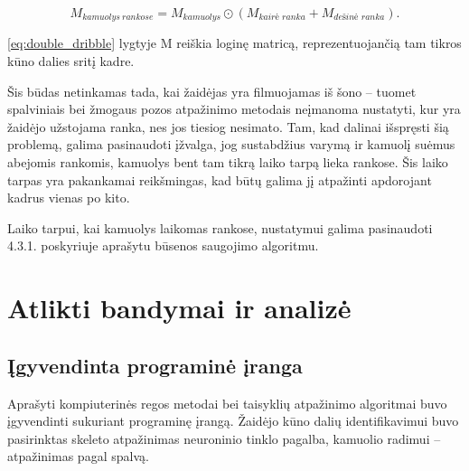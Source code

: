 \documentclass{VUMIFPSbakalaurinis}
\begin{document}
\begin{equation}\label{eq:double_dribble}
	M_{kamuolys\ rankose} = M_{kamuolys} \odot (M_{\textit{kairė\ ranka}} + M_{\textit{dešinė\ ranka}}).
\end{equation}

\ref{eq:double_dribble} lygtyje M reiškia loginę matricą, reprezentuojančią tam tikros kūno dalies sritį kadre. 

Šis būdas netinkamas tada, kai žaidėjas yra filmuojamas iš šono – tuomet spalviniais bei žmogaus pozos atpažinimo metodais neįmanoma nustatyti, kur yra žaidėjo užstojama ranka, nes jos tiesiog nesimato. Tam, kad dalinai išspręsti šią problemą, galima pasinaudoti įžvalga, jog sustabdžius varymą ir kamuolį suėmus abejomis rankomis, kamuolys bent tam tikrą laiko tarpą lieka rankose. Šis laiko tarpas yra pakankamai reikšmingas, kad būtų galima jį atpažinti apdorojant kadrus vienas po kito. 

Laiko tarpui, kai kamuolys laikomas rankose, nustatymui galima pasinaudoti 4.3.1. poskyriuje aprašytu būsenos saugojimo algoritmu. 

\section{Atlikti bandymai ir analizė}

\subsection{Įgyvendinta programinė įranga}

Aprašyti kompiuterinės regos metodai bei taisyklių atpažinimo algoritmai buvo įgyvendinti sukuriant programinę įrangą. Žaidėjo kūno dalių identifikavimui buvo pasirinktas skeleto atpažinimas neuroninio tinklo pagalba, kamuolio radimui – atpažinimas pagal spalvą. 
\end{document}
